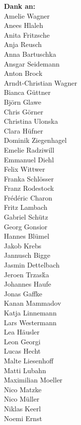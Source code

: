 \begin{minipage}[t][\textheight][b]{.25\textwidth}
\fontsize{6pt}{7.2pt}\selectfont
\raggedleft
\textbf{Dank an:}\\[1\baselineskip]
Amelie Wagner\\
Anees Hlaleh\\
Anita Fritzsche\\
Anja Reusch\\
Anna Bartuschka\\
Ansgar Seidemann\\
Anton Brock\\
Arndt-Christian Wagner\\
Bianca Güttner\\
Björn Glawe\\
Chris Görner\\
Christina Ulonska\\
Clara Hüfner\\
Dominik Ziegenhagel\\
Emelie Radziwill\\
Emmanuel Diehl\\
Felix Wittwer\\
Franka Schlösser\\
Franz Rodestock\\
Frédéric Charon\\
Fritz Lambach\\
Gabriel Schütz\\
Georg Gonsior\\
Hannes Blümel\\
Jakob Krebs\\
Jannusch Bigge\\
Jasmin Dettelbach\\
Jeroen Trzasḱa\\
Johannes Haufe\\
Jonas Gaffke\\
Kanan Mammadov\\
Katja Linnemann\\
Lars Westermann\\
Lea Häusler\\
Leon Georgi\\
Lucas Hecht\\
Malte Liesenhoff\\
Matti Lubahn\\
Maximilian Moeller\\
Nico Matzke\\
Nico Müller\\
Niklas Keerl\\
Noemi Ernst\\

\end{minipage}
